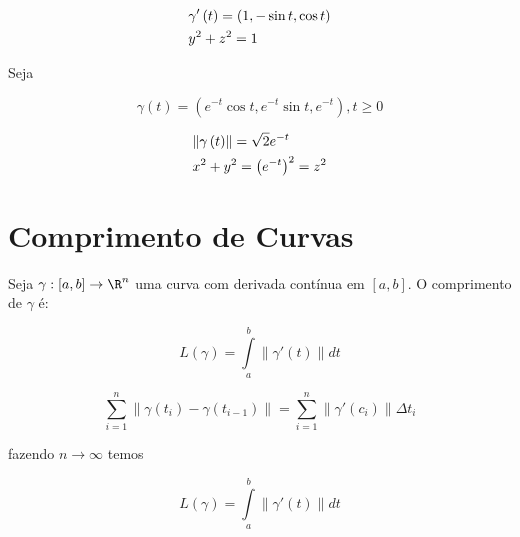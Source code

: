 \documentclass{book}
\begin{document}
\begin{sol}
\[
\begin{gathered}
\gamma '\left( t \right) = \left( {1, - \sin t,\cos t} \right) \hfill \\
y^2  + z^2  = 1 \hfill \\
\end{gathered}
\]

\end{sol}

\newpage 

\begin{ex}
Seja

\[
    \gamma \left( t \right) = \left( {e^{ - t} \cos t,e^{ - t} \sin t,e^{ - t} } \right),t \geqslant 0
\]

\end{ex}

\begin{sol}
\[
\begin{gathered}
\left\| {\gamma \left( t \right)} \right\| = \sqrt 2 e^{ - t}  \hfill \\
x^2  + y^2  = \left( {e^{ - t} } \right)^2  = z^2  \hfill \\
\end{gathered}
\]

\end{sol}

\section{Comprimento de Curvas} \label{sec08}

\begin{defn}
    Seja $\gamma :\left[ {a,b} \right] \to \R^n$ uma curva com derivada cont\'inua em $\left[ {a,b} \right]$. O comprimento de $\gamma$ \'e:

\[\boxed{
    L\left( \gamma  \right) = \int\limits_a^b {\left\| {\gamma '\left( t \right)} \right\|dt}}
\]
\end{defn}


\begin{dem}
\[
    \sum\limits_{i = 1}^n {\left\| {\gamma \left( {t_i } \right) - \gamma \left( {t_{i - 1} } \right)} \right\|}  = \sum\limits_{i = 1}^n {\left\| {\gamma '\left( {c_i } \right)} \right\|\Delta t_i }
\]

fazendo $n \to \infty$ temos

\[
    L\left( \gamma  \right) = \int\limits_a^b {\left\| {\gamma '\left( t \right)} \right\|dt}
\]

\end{dem}
\end{document}

